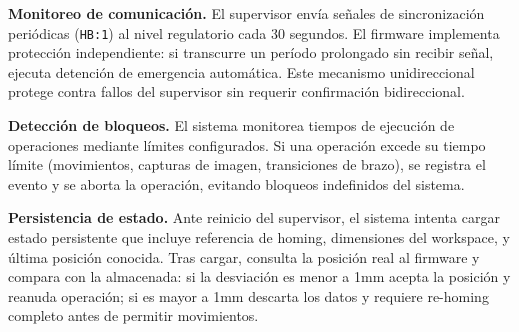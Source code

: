 \textbf{Monitoreo de comunicación.} El supervisor envía señales de sincronización periódicas (\texttt{HB:1}) al nivel regulatorio cada 30 segundos. El firmware implementa protección independiente: si transcurre un período prolongado sin recibir señal, ejecuta detención de emergencia automática. Este mecanismo unidireccional protege contra fallos del supervisor sin requerir confirmación bidireccional.

\textbf{Detección de bloqueos.} El sistema monitorea tiempos de ejecución de operaciones mediante límites configurados. Si una operación excede su tiempo límite (movimientos, capturas de imagen, transiciones de brazo), se registra el evento y se aborta la operación, evitando bloqueos indefinidos del sistema.

\textbf{Persistencia de estado.} Ante reinicio del supervisor, el sistema intenta cargar estado persistente que incluye referencia de homing, dimensiones del workspace, y última posición conocida. Tras cargar, consulta la posición real al firmware y compara con la almacenada: si la desviación es menor a 1mm acepta la posición y reanuda operación; si es mayor a 1mm descarta los datos y requiere re-homing completo antes de permitir movimientos.
